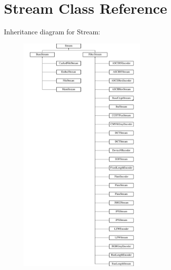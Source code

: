 \hypertarget{class_stream}{}\section{Stream Class Reference}
\label{class_stream}
Inheritance diagram for Stream\+:\begin{figure}[H]
\begin{center}
\leavevmode
\includegraphics[height=12.000000cm]{class_stream}
\end{center}
\end{figure}
